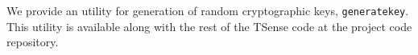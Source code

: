 

We provide an utility for generation of random cryptographic keys, \texttt{generatekey}. This utility is available along with the rest of the TSense code at the project code repository.

%
%
%
